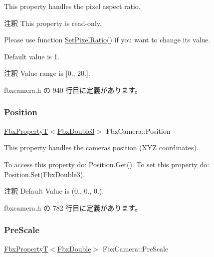 This property handles the pixel aspect ratio.

\begin{DoxyRemark}{注釈}
This property is read-\/only. 

Please use function \hyperlink{class_fbx_camera_a55058f98c5bdaed70ad02c9062804798}{Set\+Pixel\+Ratio()} if you want to change its value.
\end{DoxyRemark}
Default value is 1. \begin{DoxyRemark}{注釈}
Value range is \mbox{[}0., 20.\mbox{]}. 
\end{DoxyRemark}


 fbxcamera.\+h の 940 行目に定義があります。

\mbox{\label{class_fbx_camera_afa38d19a4ebd6fac7ea040750fd1dae9}} 
\subsubsection{\texorpdfstring{Position}{Position}}
{\footnotesize\ttfamily \hyperlink{class_fbx_property_t}{Fbx\+PropertyT}$<$\hyperlink{fbxtypes_8h_ae0a96f14cde566774c7553aa7523b7a7}{Fbx\+Double3}$>$ Fbx\+Camera\+::\+Position}

This property handles the camera\textquotesingle{}s position (X\+YZ coordinates).

To access this property do\+: Position.\+Get(). To set this property do\+: Position.\+Set(\+Fbx\+Double3).

\begin{DoxyRemark}{注釈}
Default Value is (0., 0., 0.). 
\end{DoxyRemark}


 fbxcamera.\+h の 782 行目に定義があります。

\mbox{\label{class_fbx_camera_ace6cbe41faef53ac2dc02dec31d395a4}} 
\subsubsection{\texorpdfstring{Pre\+Scale}{PreScale}}
{\footnotesize\ttfamily \hyperlink{class_fbx_property_t}{Fbx\+PropertyT}$<$\hyperlink{fbxtypes_8h_a171e72a1c46fc15c1a6c9c31948c1c5b}{Fbx\+Double}$>$ Fbx\+Camera\+::\+Pre\+Scale}

